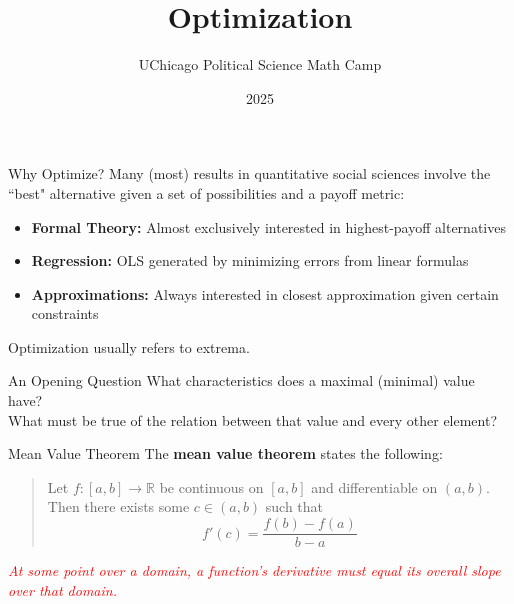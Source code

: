 \documentclass[10pt]{beamer}
\title{Optimization}
\author{UChicago Political Science Math Camp}
\institute{Ryan Gibbons \& Luke Cain}
\date{2025}
\begin{document}
\frame{\titlepage}

\begin{frame}{Why Optimize?}
    Many (most) results in quantitative social sciences involve the ``best" alternative given a set of possibilities and a payoff metric:

    \begin{itemize}
        \item \textbf{Formal Theory:} Almost exclusively interested in highest-payoff alternatives
        \item \textbf{Regression:} OLS generated by minimizing errors from linear formulas
        \item \textbf{Approximations:} Always interested in closest approximation given certain constraints
    \end{itemize}

    Optimization usually refers to extrema.
\end{frame}

\begin{frame}{An Opening Question}
    What characteristics does a maximal (minimal) value have? \\ \pause
    \vspace{1cm}
    What must be true of the relation between that value and every other element?
\end{frame}


\begin{frame}{Mean Value Theorem}
    The \textbf{mean value theorem} states the following: \\
    \vspace{1cm}

    \begin{quote}
        Let $f: [a,b] \rightarrow \mathbb{R}$ be continuous on $[a,b]$ and differentiable on $(a,b)$. Then there exists some $c \in (a,b)$ such that
\vspace{.5cm}
        \[f'(c) = \frac{f(b) - f(a)}{b-a}\]
    \end{quote}
    \pause
    \vspace{1cm}
    \textit{\textcolor{red}{At some point over a domain, a function's derivative must equal its overall slope over that domain.}}
\end{frame}
\end{document}
